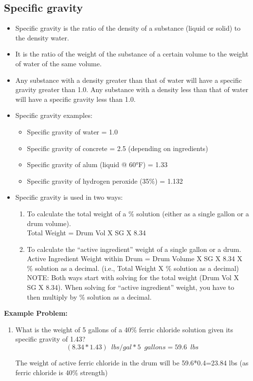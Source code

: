\subsection{Specific gravity}
\begin{itemize}
\item Specific gravity is the ratio of the density of a substance (liquid or solid) to the density water.
\item It is the ratio of the weight of the substance of a certain volume to the weight of water of the same volume.

\item Any substance with a density greater than that of water will have a specific gravity greater than 1.0. Any substance with a density less than that of water will have a specific gravity less than 1.0. 

\item Specific gravity examples:
\begin{itemize}

\item Specific gravity of water = 1.0 
\item Specific gravity of concrete = 2.5 (depending on ingredients)
\item Specific gravity of alum (liquid @ 60°F) = 1.33 
\item Specific gravity of hydrogen peroxide (35\%) = 1.132
\end{itemize}

\item Specific gravity is used in two ways:
\begin{enumerate}
\item To calculate the total weight of a \% solution (either as a single gallon or a drum volume).\\
Total Weight = Drum Vol X SG X 8.34
\item To calculate the “active ingredient” weight of a single gallon or a drum.\\

Active Ingredient Weight within Drum = Drum Volume X SG X 8.34 X \% solution as a decimal. (i.e., Total Weight X \% solution as a decimal)\\

NOTE: Both ways start with solving for the total weight (Drum Vol X SG X 8.34). When solving for “active ingredient” weight, you have to then multiply by \% solution as a decimal.

\end{enumerate}
\end{itemize}
\textbf{Example Problem:}\\
\begin{enumerate}[1.]
\item What is the weight of 5 gallons of a 40\% ferric chloride solution given its specific gravity of 1.43?
$$(8.34 * 1.43) \enspace lbs/gal*5 \enspace gallons = \boxed{59.6 \enspace lbs}$$

The weight of active ferric chloride in the drum will be 59.6*0.4=23.84 lbs (as ferric chloride is 40\% strength)

\end{enumerate}


